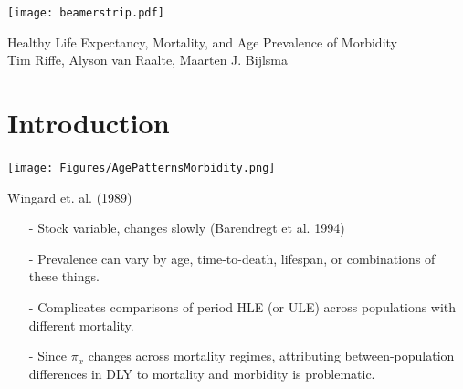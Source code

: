 \documentclass[20pt]{beamer}
\newcommand{\dd}{\; \mathrm{d}}
\begin{document}

\begin{frame}[plain]
	\vspace{-4.4cm}
 \centerline{\texttt{[image: beamerstrip.pdf]}}

	
	\huge
	\vspace{1em}
	
	Healthy Life Expectancy, Mortality, and Age Prevalence of Morbidity \\
	\vspace{1em}
	\large 
	Tim Riffe, Alyson van Raalte, Maarten J. Bijlsma
\end{frame}

\section{Introduction}

\begin{frame}[plain]
\Large
\begin{center}
\only<2>{$\mathrm{HLE} = \int \ell(x)\left(1-\pi(x)\right)\dd x$}
\end{center}
\end{frame}

\begin{frame}[plain]
\begin{center}
\texttt{[image: Figures/AgePatternsMorbidity.png]}
\end{center}
Wingard et. al. (1989)
\end{frame}
\begin{frame}[plain]
\Large
\begin{itemize}[<+->]
\item[-] Stock variable, changes slowly (Barendregt et al. 1994)
\item[-] Prevalence can vary by age, time-to-death, lifespan, or combinations of
these things.
\item[-] Complicates comparisons of period HLE (or ULE) across
populations with different mortality.
\item[-] Since $\pi_x$ changes across mortality regimes, attributing
between-population differences in DLY to mortality and morbidity is problematic.
\end{itemize}
\end{frame}
\end{document}
